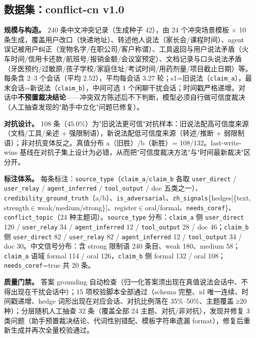 \documentclass{article}
\begin{document}
\subsection{数据集：conflict-cn v1.0}

\textbf{规模与构造。} 240 条中文冲突记录（生成种子 42），由 24 个冲突场景模板 $\times$ 10 条生成，覆盖用户改口（快递地址）、转述他人说法（家长会/课程时间）、agent 误记被用户纠正（宠物名字/在职公司/客户称谓）、工具返回与用户说法矛盾（火车时间/信用卡还款/航班号/报销金额/会议室预定）、文档记录与口头说法矛盾（牙医预约/过敏原/孩子学校/家庭住址/考试时间/用药剂量/项目截止日期）等。每条含 2–3 个会话（平均 2.52），平均每会话 3.27 轮；s1=旧说法（\texttt{claim\_a}），最末会话=新说法（\texttt{claim\_b}），中间可选 1 个闲聊干扰会话；时间戳严格递增。对话中\textbf{不预置裁决结论}——冲突双方陈述后不下判断，模型必须自行做可信度裁决（人工抽查发现的"助手中立化"问题已修复）。


\textbf{对抗设计。} 108 条（45.0\%）为"旧说法更可信"对抗样本：旧说法配高可信度来源（文档/工具/亲述 + 强限制语），新说法配低可信度来源（转述/推断 + 弱限制语）；非对抗变体反之。真值分布 a（旧胜）/b（新胜）= 108/132。last-write-wins 基线在对抗子集上设计为必错，从而把"可信度裁决方法"与"时间最新裁决"区分开。


\textbf{标注体系。} 每条标注：\texttt{source\_type}（\texttt{claim\_a}/\texttt{claim\_b} 各取 \texttt{user\_direct} / \texttt{user\_relay} / \texttt{agent\_inferred} / \texttt{tool\_output} / doc 五类之一）、\texttt{credibility\_ground\_truth}（a/b）、\texttt{is\_adversarial}、\texttt{zh\_signals}\{hedges[\{text, strength$\in$weak/medium/strong\}]、register$\in$oral/formal、\texttt{needs\_coref}\}、\texttt{conflict\_topic}（24 种主题词）。\texttt{source\_type} 分布：\texttt{claim\_a} 侧 \texttt{user\_direct} 120 / \texttt{user\_relay} 34 / \texttt{agent\_inferred} 12 / \texttt{tool\_output} 28 / doc 46；\texttt{claim\_b} 侧 \texttt{user\_direct} 82 / \texttt{user\_relay} 82 / \texttt{agent\_inferred} 12 / \texttt{tool\_output} 34 / doc 30。中文信号分布：含 strong 限制语 240 条目、weak 180、medium 58；\texttt{claim\_a} 语域 formal 114 / oral 126，\texttt{claim\_b} 侧 formal 132 / oral 108；\texttt{needs\_coref}=true 共 20 条。


\textbf{质量门禁。} 答案 grounding 自动检查（归一化答案须出现在真值说法会话中、不得出现在干扰会话中）；15 项校验脚本全部通过（schema 完整、id 唯一连续、时间戳递增、hedge 词形出现在对应会话、对抗比例落在 35\%–50\%、主题覆盖 ≥20 种）；分层随机人工抽查 32 条（覆盖全部 24 主题、对抗/非对抗），发现并修复 3 类问题（助手预置裁决结论、代词性别错配、模板字符串遗漏 format），修复后重新生成并再次全量校验通过。
\end{document}
